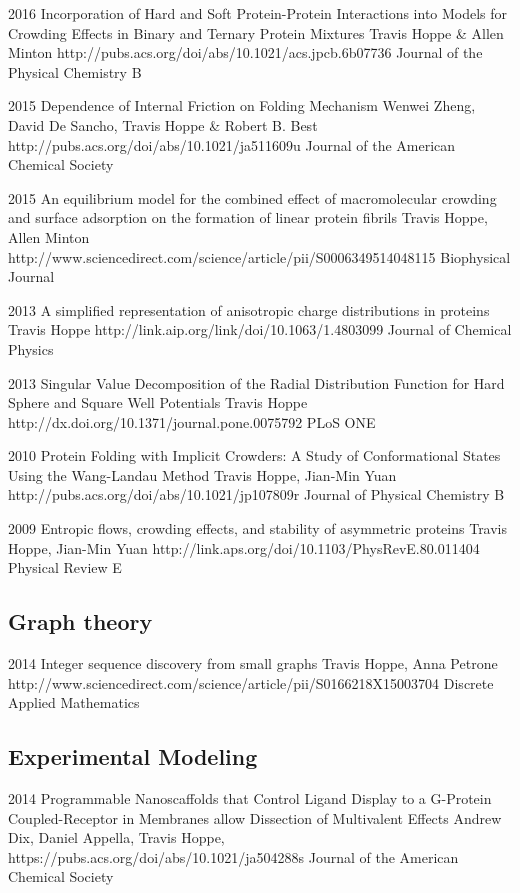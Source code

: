 \documentclass[]{scrartcl}
\begin{document}
\begin{cleanCV}
\Paper
{2016}
{Incorporation of Hard and Soft Protein-Protein Interactions into Models for Crowding Effects in Binary and Ternary Protein Mixtures}
{Travis Hoppe \& Allen Minton}
{http://pubs.acs.org/doi/abs/10.1021/acs.jpcb.6b07736}
{Journal of the Physical Chemistry B}

\Paper
{2015}
{Dependence of Internal Friction on Folding Mechanism}
{Wenwei Zheng, David De Sancho, Travis Hoppe \& Robert B. Best}
{http://pubs.acs.org/doi/abs/10.1021/ja511609u}
{Journal of the American Chemical Society}

\Paper
{2015}
{An equilibrium model for the combined effect of macromolecular crowding and surface adsorption on the formation of linear protein fibrils}
{Travis Hoppe, Allen Minton}
{http://www.sciencedirect.com/science/article/pii/S0006349514048115}
{Biophysical Journal}

\Paper
{2013}
{A simplified representation of anisotropic charge distributions in proteins}
{Travis Hoppe}
{http://link.aip.org/link/doi/10.1063/1.4803099}
{Journal of Chemical Physics}

\Paper
{2013}
{Singular Value Decomposition of the Radial Distribution Function 
for Hard Sphere and Square Well Potentials}
{Travis Hoppe}
{http://dx.doi.org/10.1371/journal.pone.0075792}
{PLoS ONE}

\Paper
{2010}
{Protein Folding with Implicit Crowders: 
  A Study of Conformational States Using the Wang-Landau Method}
{Travis Hoppe, Jian-Min Yuan}
{http://pubs.acs.org/doi/abs/10.1021/jp107809r}
{Journal of Physical Chemistry B}


\Paper
{2009}
{Entropic flows, crowding effects, and stability of asymmetric proteins}
{Travis Hoppe, Jian-Min Yuan}
{http://link.aps.org/doi/10.1103/PhysRevE.80.011404}
{Physical Review E}


\subsection{Graph theory}

\Paper
{2014}
{Integer sequence discovery from small graphs}
{Travis Hoppe, Anna Petrone}
{http://www.sciencedirect.com/science/article/pii/S0166218X15003704}
{Discrete Applied Mathematics}

\subsection{Experimental Modeling}

\Paper
{2014}
{Programmable Nanoscaffolds that Control Ligand Display to a G-Protein Coupled-Receptor in Membranes allow Dissection of Multivalent Effects}
{Andrew Dix, Daniel Appella, Travis Hoppe, \etal}
{https://pubs.acs.org/doi/abs/10.1021/ja504288s}
{Journal of the American Chemical Society}


\end{cleanCV}
\end{document}
